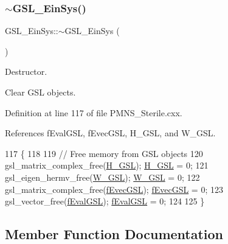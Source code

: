 \mbox{\label{structOscProb_1_1GSL__EinSys_a62c08d2a6318e6b0abdd2ca6fd47622e}} 
\subsubsection{\texorpdfstring{$\sim$\+G\+S\+L\+\_\+\+Ein\+Sys()}{~GSL\_EinSys()}}
{\footnotesize\ttfamily G\+S\+L\+\_\+\+Ein\+Sys\+::$\sim$\+G\+S\+L\+\_\+\+Ein\+Sys (\begin{DoxyParamCaption}{ }\end{DoxyParamCaption})\hspace{0.3cm}{\ttfamily [virtual]}}

Destructor.

Clear G\+SL objects. 

Definition at line 117 of file P\+M\+N\+S\+\_\+\+Sterile.\+cxx.



References f\+Eval\+G\+SL, f\+Evec\+G\+SL, H\+\_\+\+G\+SL, and W\+\_\+\+G\+SL.


\begin{DoxyCode}
117                        \{
118 
119   \textcolor{comment}{// Free memory from GSL objects}
120   gsl\_matrix\_complex\_free(\hyperlink{structOscProb_1_1GSL__EinSys_a853e4eae015326445776f9ad7e17e513}{H\_GSL}); \hyperlink{structOscProb_1_1GSL__EinSys_a853e4eae015326445776f9ad7e17e513}{H\_GSL} = 0;
121   gsl\_eigen\_hermv\_free(\hyperlink{structOscProb_1_1GSL__EinSys_a366b813a541dcfbaad2ac3d096f31aa1}{W\_GSL}); \hyperlink{structOscProb_1_1GSL__EinSys_a366b813a541dcfbaad2ac3d096f31aa1}{W\_GSL} = 0;
122   gsl\_matrix\_complex\_free(\hyperlink{structOscProb_1_1GSL__EinSys_a91ee7084c424d7a92b5001931e036fd6}{fEvecGSL}); \hyperlink{structOscProb_1_1GSL__EinSys_a91ee7084c424d7a92b5001931e036fd6}{fEvecGSL} = 0;
123   gsl\_vector\_free(\hyperlink{structOscProb_1_1GSL__EinSys_af69688ebfa983199ae54513628658b4d}{fEvalGSL}); \hyperlink{structOscProb_1_1GSL__EinSys_af69688ebfa983199ae54513628658b4d}{fEvalGSL} = 0;
124 
125 \}
\end{DoxyCode}


\subsection{Member Function Documentation}
\mbox{\label{structOscProb_1_1GSL__EinSys_a17c804d4400c2cc4d32ff0438ed0284e}} 
